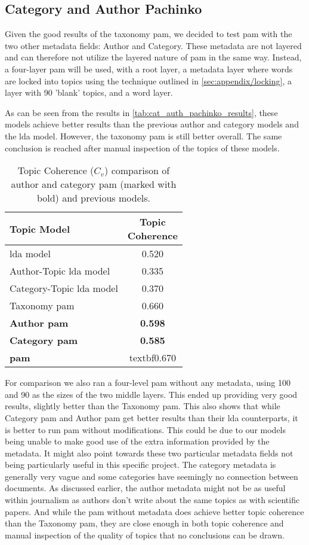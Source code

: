 \subsection{Category and Author Pachinko}\label{app:cat_auth_pachinko}
Given the good results of the taxonomy \gls{pam}, we decided to test \gls{pam} with the two other metadata fields: Author and Category.
These metadata are not layered and can therefore not utilize the layered nature of \gls{pam} in the same way.
Instead, a four-layer \gls{pam} will be used, with a root layer, a metadata layer where words are locked into topics using the technique outlined in \autoref{sec:appendix/locking}, a layer with 90 'blank' topics, and a word layer.

As can be seen from the results in \autoref{tab:cat_auth_pachinko_results}, these models achieve better results than the previous author and category models and the \gls{lda} model.
However, the taxonomy \gls{pam} is still better overall.
The same conclusion is reached after manual inspection of the topics of these models.

\begin{table}[h]
	\centering
	\caption{Topic Coherence ($C_v$) comparison of author and category \gls{pam} (marked with bold) and previous models.}
	\begin{tabular}{l|c}
		Topic Model & \makecell{Topic \\ Coherence} \\
		\midrule
		\acrfull{lda} model & 0.520 \\
		Author-Topic \acrlong{lda} model & 0.335 \\
		Category-Topic \acrlong{lda} model & 0.370 \\
		Taxonomy \acrlong{pam} & 0.660 \\
		\textbf{Author \acrlong{pam}} & \textbf{0.598} \\
		\textbf{Category \acrlong{pam}} & \textbf{0.585} \\
		\textbf{\acrlong{pam}} & textbf{0.670}
	\end{tabular}
	\label{tab:cat_auth_pachinko_results}
\end{table}

For comparison we also ran a four-level \gls{pam} without any metadata, using 100 and 90 as the sizes of the two middle layers.
This ended up providing very good results, slightly better than the Taxonomy \gls{pam}.
This also shows that while Category \gls{pam} and Author \gls{pam} get better results than their \gls{lda} counterparts, it is better to run \gls{pam} without modifications.
This could be due to our models being unable to make good use of the extra information provided by the metadata.
It might also point towards these two particular metadata fields not being particularly useful in this specific project.
The category metadata is generally very vague and some categories have seemingly no connection between documents.
As discussed earlier, the author metadata might not be as useful within journalism as authors don't write about the same topics as with scientific papers.
And while the \gls{pam} without metadata does achieve better topic coherence than the Taxonomy \gls{pam}, they are close enough in both topic coherence and manual inspection of the quality of topics that no conclusions can be drawn.
